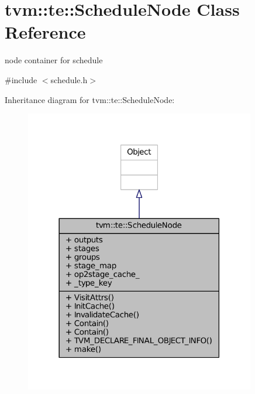 \hypertarget{classtvm_1_1te_1_1ScheduleNode}{}\section{tvm\+:\+:te\+:\+:Schedule\+Node Class Reference}
\label{classtvm_1_1te_1_1ScheduleNode}


node container for schedule  




{\ttfamily \#include $<$schedule.\+h$>$}



Inheritance diagram for tvm\+:\+:te\+:\+:Schedule\+Node\+:
\nopagebreak
\begin{figure}[H]
\begin{center}
\leavevmode
\includegraphics[width=285pt]{classtvm_1_1te_1_1ScheduleNode__inherit__graph}
\end{center}
\end{figure}


